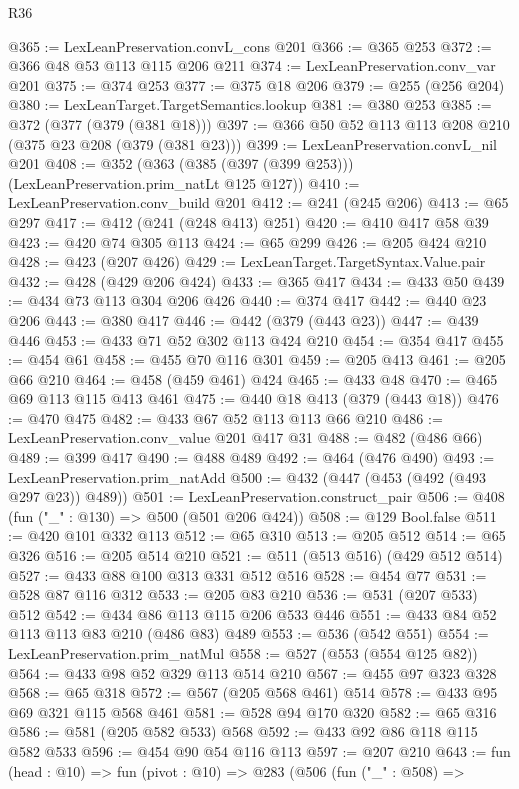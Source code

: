 \begin{lexlean}{R36}
\begin{coremodule}
@365 := LexLeanPreservation.convL_cons @201
@366 := @365 @253
@372 := @366 @48 @53 @113 @115 @206 @211
@374 := LexLeanPreservation.conv_var @201
@375 := @374 @253
@377 := @375 @18 @206
@379 := @255 (@256 @204)
@380 := LexLeanTarget.TargetSemantics.lookup
@381 := @380 @253
@385 := @372 (@377 (@379 (@381 @18)))
@397 := @366 @50 @52 @113 @113 @208 @210 (@375 @23 @208 (@379 (@381 @23)))
@399 := LexLeanPreservation.convL_nil @201
@408 := @352 (@363 (@385 (@397 (@399 @253))) (LexLeanPreservation.prim_natLt @125 @127))
@410 := LexLeanPreservation.conv_build @201
@412 := @241 (@245 @206)
@413 := @65 @297
@417 := @412 (@241 (@248 @413) @251)
@420 := @410 @417 @58 @39
@423 := @420 @74 @305 @113
@424 := @65 @299
@426 := @205 @424 @210
@428 := @423 (@207 @426)
@429 := LexLeanTarget.TargetSyntax.Value.pair
@432 := @428 (@429 @206 @424)
@433 := @365 @417
@434 := @433 @50
@439 := @434 @73 @113 @304 @206 @426
@440 := @374 @417
@442 := @440 @23 @206
@443 := @380 @417
@446 := @442 (@379 (@443 @23))
@447 := @439 @446
@453 := @433 @71 @52 @302 @113 @424 @210
@454 := @354 @417
@455 := @454 @61
@458 := @455 @70 @116 @301
@459 := @205 @413
@461 := @205 @66 @210
@464 := @458 (@459 @461) @424
@465 := @433 @48
@470 := @465 @69 @113 @115 @413 @461
@475 := @440 @18 @413 (@379 (@443 @18))
@476 := @470 @475
@482 := @433 @67 @52 @113 @113 @66 @210
@486 := LexLeanPreservation.conv_value @201 @417 @31
@488 := @482 (@486 @66)
@489 := @399 @417
@490 := @488 @489
@492 := @464 (@476 @490)
@493 := LexLeanPreservation.prim_natAdd
@500 := @432 (@447 (@453 (@492 (@493 @297 @23)) @489))
@501 := LexLeanPreservation.construct_pair
@506 := @408 (fun ("_" : @130) => @500 (@501 @206 @424))
@508 := @129 Bool.false
@511 := @420 @101 @332 @113
@512 := @65 @310
@513 := @205 @512
@514 := @65 @326
@516 := @205 @514 @210
@521 := @511 (@513 @516) (@429 @512 @514)
@527 := @433 @88 @100 @313 @331 @512 @516
@528 := @454 @77
@531 := @528 @87 @116 @312
@533 := @205 @83 @210
@536 := @531 (@207 @533) @512
@542 := @434 @86 @113 @115 @206 @533 @446
@551 := @433 @84 @52 @113 @113 @83 @210 (@486 @83) @489
@553 := @536 (@542 @551)
@554 := LexLeanPreservation.prim_natMul
@558 := @527 (@553 (@554 @125 @82))
@564 := @433 @98 @52 @329 @113 @514 @210
@567 := @455 @97 @323 @328
@568 := @65 @318
@572 := @567 (@205 @568 @461) @514
@578 := @433 @95 @69 @321 @115 @568 @461
@581 := @528 @94 @170 @320
@582 := @65 @316
@586 := @581 (@205 @582 @533) @568
@592 := @433 @92 @86 @118 @115 @582 @533
@596 := @454 @90 @54 @116 @113
@597 := @207 @210
@643 := fun (head : @10) =>
  fun (pivot : @10) =>
  @283
    (@506
      (fun ("_" : @508) =>

\end{coremodule}
\end{lexlean}
